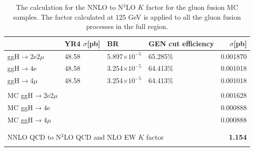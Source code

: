 \begin{table}[!hbt]
\begin{center}
\small
\begin{tabular}{llllr}
\hline
              & YR4 $\sigma$[pb] & BR   & GEN cut efficiency  &  $\sigma$[pb]     \\
\hline
ggH$\rightarrow$2e2$\mu$ & 48.58  & 5.897$\times10^{-5}$   & 65.285$\%$    & 0.001870    \\
ggH$\rightarrow$4e     & 48.58 & 3.254$\times10^{-5}$  & 64.413$\%$   & 0.001018    \\
ggH$\rightarrow$4$\mu$   & 48.58 & 3.254$\times10^{-5}$   & 64.413$\%$    & 0.001018    \\
\vspace{-0.2cm} \\
MC ggH$\rightarrow$2e2$\mu$ &   & &  & 0.001628    \\
MC ggH$\rightarrow$4e    &   & &  & 0.000888   \\
MC ggH$\rightarrow$4$\mu$  &   & &  & 0.000888 \\
\vspace{-0.2cm} \\
\hline
\vspace{-0.2cm} \\

\multicolumn{4}{l}{NNLO QCD to N$^3$LO QCD and NLO EW $K$ factor} &   \textbf{1.154} \\   %
\vspace{-0.2cm} \\
\hline
\end{tabular}
\caption{The calculation for the NNLO to N$^3$LO $K$ factor for the gluon fusion MC samples. 
The factor calculated at 125 GeV is applied to all the gluon fusion processes in the full \offshell region.}
\label{tab:ggH_YR4}
\end{center}
\end{table}


